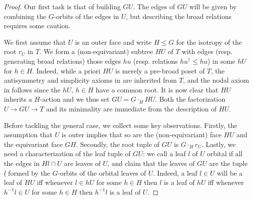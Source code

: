 \documentclass[a4paper,10pt,draft]{article}%
\numberwithin{equation}{section}%
\numberwithin{figure}{section}
\begin{document}
\begin{proof}
	Our first task is that of building $GU$. The edges of $GU$ will be given by combining 
	the $G$-orbits of the edges in $U$, but describing the broad relations requires some caution.

	We first assume that $U$ is an outer face and write	$H \leq G$ for the isotropy of the root $r_U$ in $T$.
	We form a (non-equivariant) subtree $HU$ of $T$ with edges (resp. generating broad relations) those edges
	$h u$ (resp. relations $h u^{\uparrow} \leq hu$) in some $hU$ for $h \in H$.
	Indeed, while a priori $HU$ is merely a pre-broad poset of $T$, the antisymmetry and simplicity axioms in \cite[Defs. 5.1 and 5.3]{Per17} are inherited from $T$, and the nodal axiom in
	\cite[Def. 5.9]{Per17} follows since the $h U$, $h \in H$ have a common root. It is now clear that $HU$ inherits a $H$-action and we thus set $GU = G \cdot_H HU$.
	Both the factorization $U \to GU \to T$ and its minimality are immediate from the description of $HU$.
	
	Before tackling the general case, we collect some key observations. Firstly, the assumption that $U$ is outer implies that so are the (non-equivariant) face $HU$ and the equivariant face $GH$. Secondly, the root tuple of 
	$GU$ is $G\cdot_H r_U$.
	Lastly, we need a characterization of the leaf tuple of $GU$: we call a leaf $l$ of $U$ orbital if 
all the edges in $Hl \cap U$ are leaves of $U$, 
	and claim that the leaves of $GU$ are the tuple $\underline{l}$ formed by the $G$-orbits of the orbital leaves of $U$. Indeed, a leaf $l\in U$ will be a leaf of $HU$ iff whenever $l \in hU$ for some $h\in H$ then $l$ is a leaf of $hU$ iff
	whenever $h^{-1} l \in U$ for some $h\in H$ then $h^{-1}l$ is a leaf of $U$.
	

\end{proof}
\end{document}
